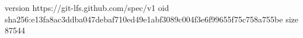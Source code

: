 version https://git-lfs.github.com/spec/v1
oid sha256:e13fa8ac3ddba047debaf710ed49e1abf3089c004f3e6f99655f75c758a755be
size 87544
